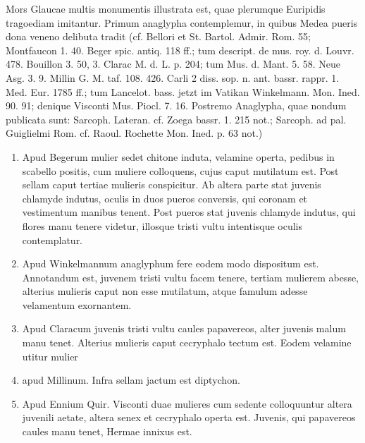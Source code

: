 \documentclass[landscape, a4paper, 11pt, oneside, polutonikogreek, german]{article}
\begin{document}
Mors Glaucae multis monumentis illustrata est, quae plerumque Euripidis tragoediam imitantur. Primum anaglypha contemplemur, in quibus Medea pueris dona veneno delibuta tradit (cf. Bellori et St. Bartol. Admir. Rom. 55; Montfaucon 1. 40. Beger spic. antiq. 118 ff.; tum descript. de mus. roy. d. Louvr. 478. Bouillon 3. 50, 3. Clarac M. d. L. p. 204; tum Mus. d. Mant. 5. 58. Neue Asg. 3. 9. Millin G. M. taf. 108. 426. Carli 2 diss. sop. n. ant. bassr. rappr. 1. Med. Eur. 1785 ff.; tum Lancelot. bass. jetzt im Vatikan Winkelmann. Mon. Ined. 90. 91; denique Visconti Mus. Piocl. 7. 16. Postremo Anaglypha, quae nondum publicata sunt: Sarcoph. Lateran. cf. Zoega bassr. 1. 215 not.; Sarcoph. ad pal. Guiglielmi Rom. cf. Raoul. Rochette Mon. Ined. p. 63 not.)
\begin{enumerate}
    \item Apud Begerum mulier sedet chitone induta, velamine operta, pedibus in scabello positis, cum muliere colloquens, cujus caput mutilatum est. Post sellam caput tertiae mulieris conspicitur. Ab altera parte stat juvenis chlamyde indutus, oculis in duos pueros conversis, qui coronam et vestimentum manibus tenent. Post pueros stat juvenis chlamyde indutus, qui flores manu tenere videtur, illosque tristi vultu intentisque oculis contemplatur.

    \item Apud Winkelmannum anaglyphum fere eodem modo dispositum est. Annotandum est, juvenem tristi vultu facem tenere, tertiam mulierem abesse, alterius mulieris caput non esse mutilatum, atque famulum adesse velamentum exornantem.

    \item Apud Claracum juvenis tristi vultu caules papavereos, alter juvenis malum manu tenet. Alterius mulieris caput cecryphalo tectum est. Eodem velamine utitur mulier

    \item apud Millinum. Infra sellam jactum est diptychon.

    \item Apud Ennium Quir. Visconti duae mulieres cum sedente colloquuntur altera juvenili aetate, altera senex et cecryphalo operta est. Juvenis, qui papavereos caules manu tenet, Hermae innixus est.
\end{enumerate}
\end{document}
